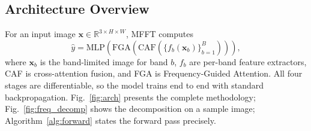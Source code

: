 \documentclass[journal]{IEEEtran}
\begin{document}
\subsection{Architecture Overview}
For an input image $\mathbf{x} \in \mathbb{R}^{3 \times H \times W}$, MFFT computes
\begin{equation}
\hat{y} = \mathrm{MLP}\!\left(\mathrm{FGA}\!\left(\mathrm{CAF}\!\left(\{f_b(\mathbf{x}_b)\}_{b=1}^{B}\right)\right)\right),
\label{eq:pipeline}
\end{equation}
where $\mathbf{x}_b$ is the band-limited image for band $b$, $f_b$ are per-band feature extractors, CAF is cross-attention fusion, and FGA is Frequency-Guided Attention. All four stages are differentiable, so the model trains end to end with standard backpropagation. Fig.~\ref{fig:arch} presents the complete methodology; Fig.~\ref{fig:freq_decomp} shows the decomposition on a sample image; Algorithm~\ref{alg:forward} states the forward pass precisely.
\end{document}

